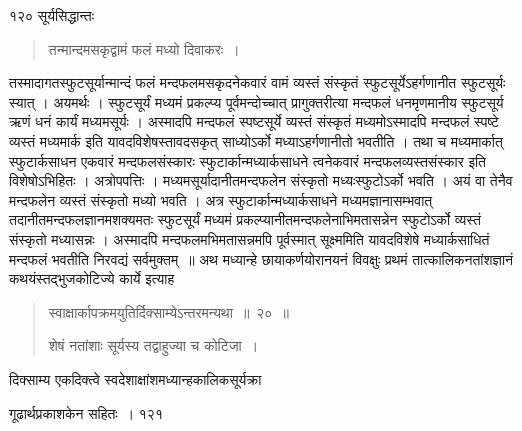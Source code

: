 \documentclass[11pt, openany]{book}
\begin{document}
\noindent १२० \hspace{4cm} सूर्यसिद्धान्तः
\vspace{1cm}
\begin{quote}

  {\ssi तन्मान्दमसकृद्वामं फलं मध्यो दिवाकरः~।}
\end{quote}
\begin{sloppypar}
 तस्मादागतस्फुटसूर्यान्मान्दं फलं मन्दफलमसकृदनेकवारं वामं व्यस्तं संस्कृतं स्फुटसूर्येऽहर्गणानीत स्फुटसूर्यः स्यात् । अयमर्थः । स्फुटसूर्यं मध्यमं प्रकल्प्य पूर्वमन्दोच्चात् प्रागुक्तरीत्या मन्दफलं धनमृणमानीय स्फुटसूर्य ऋणं धनं कार्यं मध्यमसूर्यः । अस्मादपि मन्दफलं स्पष्टसूर्ये व्यस्तं संस्कृतं मध्यमोऽस्मादपि मन्दफलं स्पष्टे व्यस्तं मध्यमार्क इति यावदविशेषस्तावदसकृत् साध्योऽर्को मध्याऽहर्गणानीतो भवतीति । तथा च मध्यमार्कात् स्फुटार्कसाधन एकवारं मन्दफलसंस्कारः स्फुटार्कान्मध्यार्कसाधने त्वनेकवारं मन्दफलव्यस्तसंस्कार इति विशेषोऽभिहितः । अत्रोपपत्तिः । मध्यमसूर्यादानीतमन्दफलेन संस्कृतो मध्यःस्फुटोऽर्को भवति । अयं वा तेनैव मन्दफलेन व्यस्तं संस्कृतो मध्यो भवति । अत्र स्फुटार्कान्मध्यार्कसाधने मध्यमज्ञानासम्भवात् तदानीतमन्दफलज्ञानमशक्यमतः स्फुटसूर्यं मध्यमं प्रकल्प्यानीतमन्दफलेनाभिमतासन्नेन स्फुटोऽर्को व्यस्तं संस्कृतो मध्यासन्नः । अस्मादपि मन्दफलमभिमतासन्नमपि पूर्वस्मात् सूक्ष्ममिति यावदविशेषे मध्यार्कसाधितं मन्दफलं भवतीति निरवद्यं सर्वमुक्तम्~॥ अथ मध्यान्हे छायाकर्णयोरानयनं विवक्षुः प्रथमं तात्कालिकनतांशज्ञानं कथयंस्तद्भुजकोटिज्ये कार्ये इत्याह\textendash
\end{sloppypar}
\begin{quote}

 {\ssi स्वाक्षार्कापक्रमयुतिर्दिक्साम्येऽन्तरमन्यथा~॥~२०~॥

 शेषं नतांशाः सूर्यस्य तद्वाहुज्या च कोटिजा~।}
\end{quote}

दिक्साम्य एकदिक्त्वे स्वदेशाक्षांशमध्यान्हकालिकसूर्यक्रा\textendash

\newpage



\hspace{3cm} गूढार्थप्रकाशकेन सहितः~। \hfill १२१
\vspace{1cm}
\end{document}
